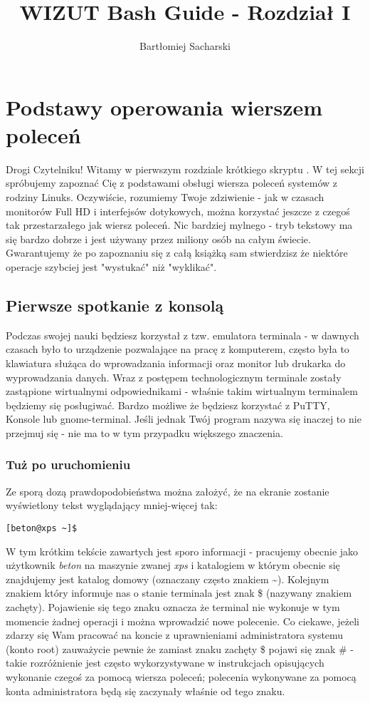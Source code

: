 \documentclass[10 pt, a4paper, draft]{report}
\author{Bartłomiej Sacharski}
\title{WIZUT Bash Guide - Rozdział I}
\begin{document}
\maketitle
\tableofcontents
\newpage

\chapter{Podstawy operowania wierszem poleceń}
Drogi Czytelniku! \newline
Witamy w pierwszym rozdziale krótkiego skryptu . %
W tej sekcji spróbujemy zapoznać Cię z podstawami obsługi wiersza poleceń systemów z rodziny Linuks. Oczywiście, rozumiemy Twoje zdziwienie - jak w czasach monitorów Full HD i interfejsów dotykowych, można korzystać jeszcze z czegoś tak przestarzałego jak wiersz poleceń. Nic bardziej mylnego - tryb tekstowy ma się bardzo dobrze i jest używany przez miliony osób na całym świecie. Gwarantujemy że po zapoznaniu się z całą książką sam stwierdzisz że niektóre operacje szybciej jest "wystukać" niż "wyklikać".

\section{Pierwsze spotkanie z konsolą}
Podczas swojej nauki będziesz korzystał z tzw. emulatora terminala - w dawnych czasach było to urządzenie pozwalające na pracę z komputerem, często była to klawiatura służąca do wprowadzania informacji oraz monitor lub drukarka do wyprowadzania danych. Wraz z postępem technologicznym terminale zostały zastąpione wirtualnymi odpowiednikami - właśnie takim wirtualnym terminalem będziemy się posługiwać. Bardzo możliwe że będziesz korzystać z PuTTY, Konsole lub gnome-terminal. Jeśli jednak Twój program nazywa się inaczej to nie przejmuj się - nie ma to w tym przypadku większego znaczenia.

\subsection{Tuż po uruchomieniu}
Ze sporą dozą prawdopodobieństwa można założyć, że na ekranie zostanie wyświetlony tekst wyglądający mniej-więcej tak:
\begin{verbatim}
[beton@xps ~]$ 
\end{verbatim}
W tym krótkim tekście zawartych jest sporo informacji - pracujemy obecnie jako użytkownik \textit{beton} na maszynie zwanej \textit{xps} i katalogiem w którym obecnie się znajdujemy jest katalog domowy (oznaczany często znakiem \textasciitilde). Kolejnym znakiem który informuje nas o stanie terminala jest znak \$ (nazywany znakiem zachęty). Pojawienie się tego znaku oznacza że terminal nie wykonuje w tym momencie żadnej operacji i można wprowadzić nowe polecenie. Co ciekawe, jeżeli zdarzy się Wam pracować na koncie z uprawnieniami administratora systemu (konto root) zauważycie pewnie że zamiast znaku zachęty \$ pojawi się znak \# - takie rozróżnienie jest często wykorzystywane w instrukcjach opisujących wykonanie czegoś za pomocą wiersza poleceń; polecenia wykonywane za pomocą konta administratora będą się zaczynały właśnie od tego znaku.
\end{document}
